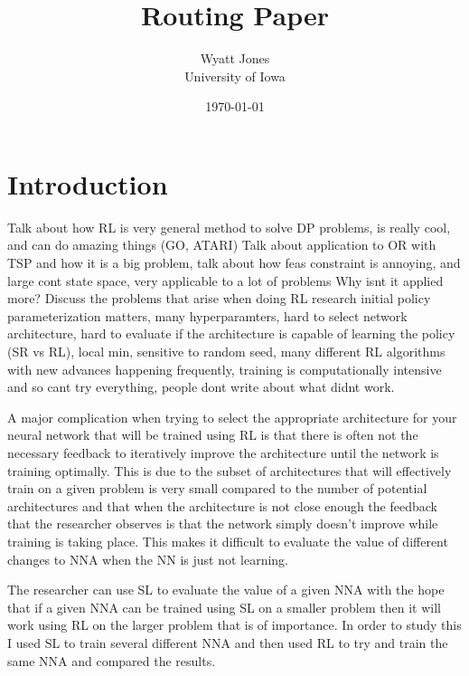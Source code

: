 \documentclass[12pt]{article}
\title{Routing Paper}
\author{Wyatt Jones\\University of Iowa}
\date{\today}
\begin{document}
\maketitle


\section{Introduction}
\label{intro}

\citep{2016_Silver}

\citep{2017_Silver}

\citep{2017_Hessel}

Talk about how RL is very general method to solve DP problems, is really cool, and can do amazing things (GO, ATARI)
Talk about application to OR with TSP and how it is a big problem, talk about how feas constraint is annoying, and large cont state space, very applicable to a lot of problems
Why isnt it applied more?
Discuss the problems that arise when doing RL research initial policy parameterization matters, many hyperparamters, hard to select network architecture, hard to evaluate if the architecture is capable of learning the policy (SR vs RL), local min, sensitive to random seed, many different RL algorithms with new advances happening frequently, training is computationally intensive and so cant try everything, people dont write about what didnt work.

A major complication when trying to select the appropriate architecture for your neural network that will be trained using RL is that there is often not the necessary feedback to iteratively improve the architecture until the network is training optimally. This is due to the subset of architectures that will effectively train on a given problem is very small compared to the number of potential architectures and that when the architecture is not close enough the feedback that the researcher observes is that the network simply doesn't improve while training is taking place. This makes it difficult to evaluate the value of different changes to NNA when the NN is just not learning.

The researcher can use SL to evaluate the value of a given NNA with the hope that if a given NNA can be trained using SL on a smaller problem then it will work using RL on the larger problem that is of importance. In order to study this I used SL to train several different NNA and then used RL to try and train the same NNA and compared the results.

\end{document}
